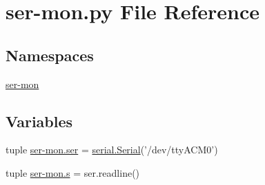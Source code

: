 \hypertarget{ser-mon_8py}{\section{ser-\/mon.py File Reference}
\label{ser-mon_8py}
}
\subsection*{Namespaces}
\begin{DoxyCompactItemize}
\item 
\hyperlink{namespaceser-mon}{ser-\/mon}
\end{DoxyCompactItemize}
\subsection*{Variables}
\begin{DoxyCompactItemize}
\item 
tuple \hyperlink{namespaceser-mon_a172fe4d911910417504386161b9d1891}{ser-\/mon.\-ser} = \hyperlink{HardwareSerial_8h_a7b8c4a195c58f9eb8750e94955c5aa4b}{serial.\-Serial}('/dev/tty\-A\-C\-M0')
\item 
tuple \hyperlink{namespaceser-mon_a37e0cdc510e97e5ed77ef9606c5659f0}{ser-\/mon.\-s} = ser.\-readline()
\end{DoxyCompactItemize}
